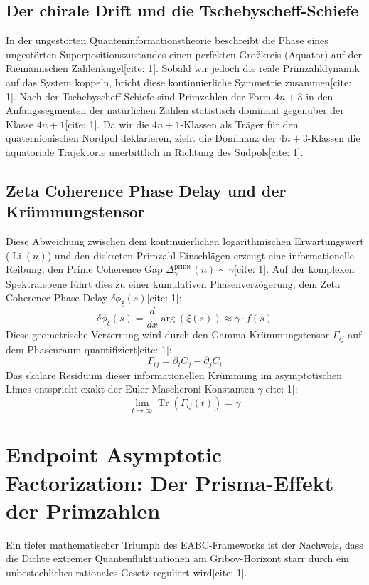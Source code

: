 \documentclass[11pt,a4paper]{article}
\begin{document}
	\subsection{Der chirale Drift und die Tschebyscheff-Schiefe}
	In der ungestörten Quanteninformationstheorie beschreibt die Phase eines ungestörten Superpositionszustandes einen perfekten Großkreis (Äquator) auf der Riemannschen Zahlenkugel[cite: 1]. Sobald wir jedoch die reale Primzahldynamik auf das System koppeln, bricht diese kontinuierliche Symmetrie zusammen[cite: 1].
	Nach der Tschebyscheff-Schiefe sind Primzahlen der Form $4n+3$ in den Anfangssegmenten der natürlichen Zahlen statistisch dominant gegenüber der Klasse $4n+1$[cite: 1]. Da wir die $4n+1$-Klassen als Träger für den quaternionischen Nordpol deklarieren, zieht die Dominanz der $4n+3$-Klassen die äquatoriale Trajektorie unerbittlich in Richtung des Südpols[cite: 1].
	
	\subsection{Zeta Coherence Phase Delay und der Krümmungstensor}
	Diese Abweichung zwischen dem kontinuierlichen logarithmischen Erwartungswert ($\operatorname{Li}(n)$) und den diskreten Primzahl-Einschlägen erzeugt eine informationelle Reibung, den Prime Coherence Gap $\Delta_{\gamma}^{\text{prime}}(n)\sim\gamma$[cite: 1]. Auf der komplexen Spektralebene führt dies zu einer kumulativen Phasenverzögerung, dem Zeta Coherence Phase Delay $\delta\phi_{\xi}(s)$[cite: 1]:
	\begin{equation}
		\delta\phi_{\xi}(s)=\frac{d}{dx}\arg(\xi(s))\approx\gamma\cdot f(s)
	\end{equation}
	Diese geometrische Verzerrung wird durch den Gamma-Krümmungstensor $\Gamma_{ij}$ auf dem Phasenraum quantifiziert[cite: 1]:
	\begin{equation}
		\Gamma_{ij}=\partial_{i}C_{j}-\partial_{j}C_{i}
	\end{equation}
	Das skalare Residuum dieser informationellen Krümmung im asymptotischen Limes entspricht exakt der Euler-Mascheroni-Konstanten $\gamma$[cite: 1]:
	\begin{equation}
		\lim_{t\to\infty}\operatorname{Tr}(\Gamma_{ij}(t))=\gamma
	\end{equation}
	
	\section{Endpoint Asymptotic Factorization: Der Prisma-Effekt der Primzahlen}
	Ein tiefer mathematischer Triumph des EABC-Frameworks ist der Nachweis, dass die Dichte extremer Quantenfluktuationen am Gribov-Horizont starr durch ein unbestechliches rationales Gesetz reguliert wird[cite: 1].
	
\end{document}
